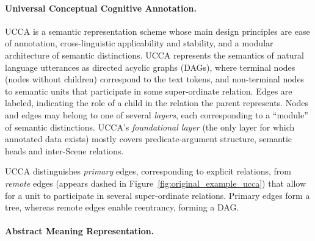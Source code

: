 \documentclass[11pt,a4paper]{article}
\newcommand{\oa}[1]{\footnote{\color{red}OA: #1}}
\begin{document}

\paragraph{Universal Conceptual Cognitive Annotation.}\label{sec:ucca}
UCCA \cite{abend2013universal} is a semantic representation scheme whose main design principles
are ease of annotation, cross-linguistic applicability and stability, and a modular architecture of semantic distinctions.
UCCA represents the semantics of natural language utterances
as directed acyclic graphs (DAGs), where terminal nodes (nodes without children)
correspond to the text tokens, and non-terminal nodes to semantic units that participate
in some super-ordinate relation.
Edges are labeled, indicating the role of a child in the relation the parent represents.
Nodes and edges may belong to one of several \textit{layers}, each corresponding
to a ``module'' of semantic distinctions.
UCCA's \textit{foundational layer} (the only layer for which annotated data exists) 
mostly covers predicate-argument structure, semantic heads and inter-Scene relations.

UCCA distinguishes \textit{primary} edges, corresponding 
to explicit relations, from \textit{remote} edges (appears dashed in
Figure~\ref{fig:original_example_ucca}) that allow for a unit to participate
in several super-ordinate relations.
Primary edges form a tree, whereas remote edges enable reentrancy, forming a DAG.

\paragraph{Abstract Meaning Representation.}\label{sec:amr}
\end{document}
